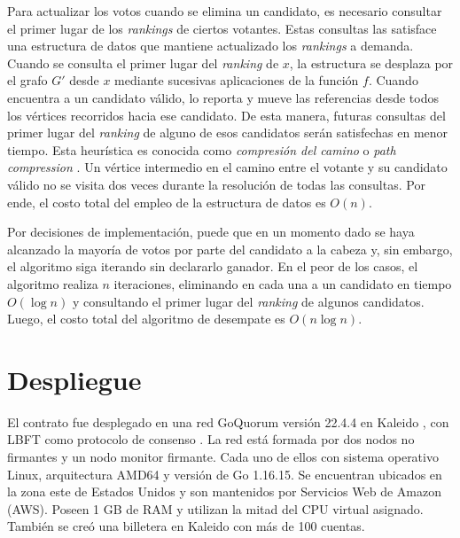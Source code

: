Para actualizar los votos cuando se elimina un candidato, es necesario consultar el primer lugar de los \textit{rankings} de ciertos votantes. Estas consultas las satisface una estructura de datos que mantiene actualizado los \textit{rankings} a demanda. Cuando se consulta el primer lugar del \textit{ranking} de $x$, la estructura se desplaza por el grafo $G'$ desde $x$ mediante sucesivas aplicaciones de la funci\'on $f$. Cuando encuentra a un candidato v\'alido, lo reporta y mueve las referencias desde todos los v\'ertices recorridos hacia ese candidato. De esta manera, futuras consultas del primer lugar del \textit{ranking} de alguno de esos candidatos ser\'an satisfechas en menor tiempo. Esta heur\'istica es conocida como \textit{compresi\'on del camino} o \textit{path compression} \citep{intro-to-algo-3}.  Un v\'ertice intermedio en el camino entre el votante y su candidato v\'alido no se visita dos veces durante la resoluci\'on de todas las consultas. Por ende, el costo total del empleo de la estructura de datos es $O(n)$.

Por decisiones de implementaci\'on, puede que en un momento dado se haya alcanzado la mayor\'ia de  votos por parte del candidato a la cabeza y, sin embargo, el algoritmo siga iterando sin declararlo ganador. En el peor de los casos, el algoritmo realiza $n$ iteraciones, eliminando en cada una a un candidato en tiempo $O(\log n)$ y consultando el primer lugar del \textit{ranking} de algunos candidatos. Luego, el costo total del algoritmo de desempate es $O(n \log n)$.

\section{Despliegue}\label{sec:implementation:kaleido}
El contrato fue desplegado en una red GoQuorum versi\'on 22.4.4 en Kaleido \citep{kaleido},   con LBFT como protocolo de consenso \citep{lbft}.   La red est\'a formada por dos nodos no firmantes y un nodo monitor firmante. Cada uno de ellos con sistema operativo Linux, arquitectura AMD64 y versi\'on de Go 1.16.15. Se encuentran ubicados en la zona este de Estados Unidos  y son mantenidos por Servicios Web de Amazon (AWS).  Poseen 1 GB de RAM y utilizan la mitad del CPU virtual asignado.   Tambi\'en se cre\'o una billetera en Kaleido con m\'as de 100 cuentas. 

